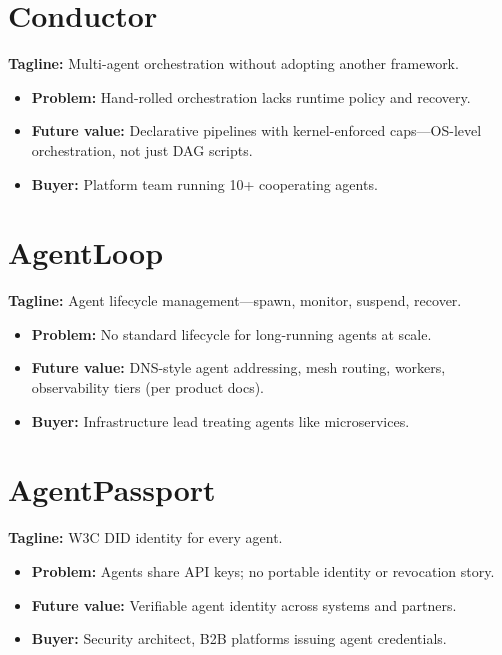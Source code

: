 \section{Conductor \statusplan}

\textbf{Tagline:} Multi-agent orchestration without adopting another framework.

\begin{itemize}
  \item \textbf{Problem:} Hand-rolled orchestration lacks runtime policy and recovery.
  \item \textbf{Future value:} Declarative pipelines with kernel-enforced caps---OS-level orchestration, not just DAG scripts.
  \item \textbf{Buyer:} Platform team running 10+ cooperating agents.
\end{itemize}

\section{AgentLoop \statusplan}

\textbf{Tagline:} Agent lifecycle management---spawn, monitor, suspend, recover.

\begin{itemize}
  \item \textbf{Problem:} No standard lifecycle for long-running agents at scale.
  \item \textbf{Future value:} DNS-style agent addressing, mesh routing, workers, observability tiers (per product docs).
  \item \textbf{Buyer:} Infrastructure lead treating agents like microservices.
\end{itemize}

\section{AgentPassport \statusplan}

\textbf{Tagline:} W3C DID identity for every agent.

\begin{itemize}
  \item \textbf{Problem:} Agents share API keys; no portable identity or revocation story.
  \item \textbf{Future value:} Verifiable agent identity across systems and partners.
  \item \textbf{Buyer:} Security architect, B2B platforms issuing agent credentials.
\end{itemize}

